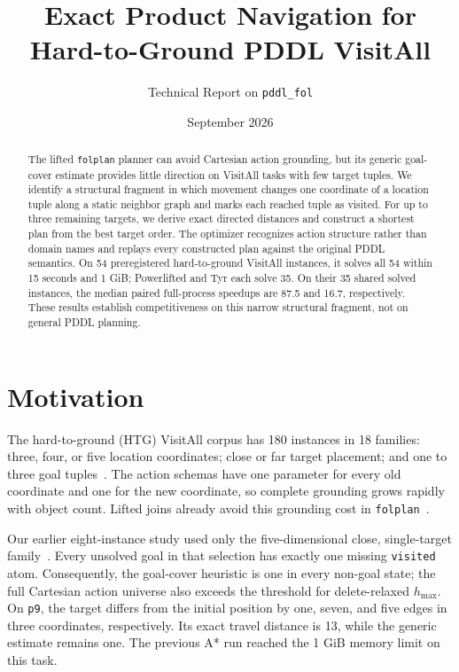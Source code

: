 \documentclass[10pt,a4paper]{article}
\title{Exact Product Navigation for Hard-to-Ground PDDL VisitAll}
\author{Technical Report on \texttt{pddl\_fol}}
\date{September 2026}
\begin{document}
\maketitle

\begin{abstract}
The lifted \texttt{folplan} planner can avoid Cartesian action grounding, but
its generic goal-cover estimate provides little direction on VisitAll tasks
with few target tuples. We identify a structural fragment in which movement
changes one coordinate of a location tuple along a static neighbor graph and
marks each reached tuple as visited. For up to three remaining targets, we
derive exact directed distances and construct a shortest plan from the best
target order. The optimizer recognizes action structure rather than domain
names and replays every constructed plan against the original PDDL semantics.
On 54 preregistered hard-to-ground VisitAll instances, it solves all 54 within
15 seconds and 1 GiB; Powerlifted and Tyr each solve 35. On their 35 shared
solved instances, the median paired full-process speedups are 87.5 and 16.7,
respectively. These results establish competitiveness on this narrow
structural fragment, not on general PDDL planning.
\end{abstract}

\section{Motivation}
The hard-to-ground (HTG) VisitAll corpus has 180 instances in 18 families:
three, four, or five location coordinates; close or far target placement;
and one to three goal tuples~\cite{htg,wichlacz2022}. The action schemas have
one parameter for every old coordinate and one for the new coordinate, so
complete grounding grows rapidly with object count. Lifted joins already
avoid this grounding cost in \texttt{folplan}~\cite{previous}.

Our earlier eight-instance study used only the five-dimensional close,
single-target family~\cite{previous}. Every unsolved goal in that selection
has exactly one missing \texttt{visited} atom. Consequently, the goal-cover
heuristic is one in every non-goal state; the full Cartesian action universe
also exceeds the threshold for delete-relaxed $h_{\max}$. On \texttt{p9},
the target differs from the initial position by one, seven, and five edges
in three coordinates, respectively. Its exact travel distance is 13, while
the generic estimate remains one. The previous A* run reached the 1 GiB
memory limit on this task.
\end{document}
